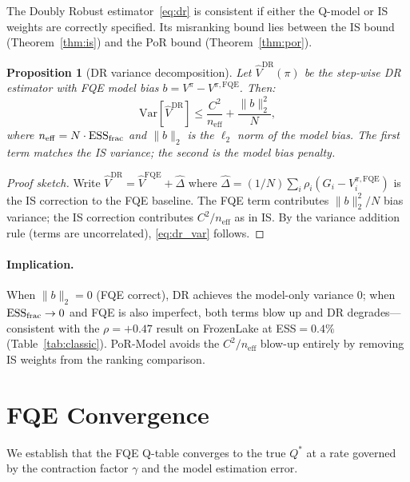 \documentclass[10pt]{article}
\theoremstyle{plain}
\newtheorem{proposition}[theorem]{Proposition}
\theoremstyle{definition}
\theoremstyle{remark}
\newcommand{\ESS}{\mathrm{ESS}}
\newcommand{\neff}{n_{\mathrm{eff}}}
\begin{document}
The Doubly Robust estimator~\eqref{eq:dr} is consistent if either the
Q-model or IS weights are correctly specified.  Its misranking bound lies
between the IS bound (Theorem~\ref{thm:is}) and the PoR bound
(Theorem~\ref{thm:por}).

\begin{proposition}[DR variance decomposition]
\label{prop:dr_variance}
Let $\hat{V}^{\mathrm{DR}}(\pi)$ be the step-wise DR estimator with FQE
model bias $b = V^\pi - V^{\pi,\mathrm{FQE}}$.  Then:
\begin{equation}
  \mathrm{Var}[\hat{V}^{\mathrm{DR}}] \leq
  \frac{C^2}{\neff} + \frac{\|b\|^2_2}{N},
  \label{eq:dr_var}
\end{equation}
where $\neff=N\cdot\ESS_{\rm frac}$ and $\|b\|_2$ is the $\ell_2$ norm of
the model bias.  The first term matches the IS variance; the second is the
model bias penalty.
\end{proposition}

\begin{proof}[Proof sketch]
Write $\hat{V}^{\mathrm{DR}} = \hat{V}^{\mathrm{FQE}} + \hat{\Delta}$ where
$\hat{\Delta}=(1/N)\sum_i \rho_i(G_i - V^{\pi,\mathrm{FQE}}_i)$ is the IS
correction to the FQE baseline.  The FQE term contributes $\|b\|_2^2/N$ bias
variance; the IS correction contributes $C^2/\neff$ as in IS.
By the variance addition rule (terms are uncorrelated), \eqref{eq:dr_var}
follows.
\end{proof}

\paragraph{Implication.}  When $\|b\|_2=0$ (FQE correct), DR achieves
the model-only variance $0$; when $\ESS_{\rm frac}\to0$ and FQE is also
imperfect, both terms blow up and DR degrades---consistent with the
$\rho=+0.47$ result on FrozenLake at ESS$=0.4\%$ (Table~\ref{tab:classic}).
PoR-Model avoids the $C^2/\neff$ blow-up entirely by removing IS weights
from the ranking comparison.

\section{FQE Convergence}
\label{app:fqe_convergence}

We establish that the FQE Q-table converges to the true $Q^*$ at a rate
governed by the contraction factor $\gamma$ and the model estimation error.
\end{document}
